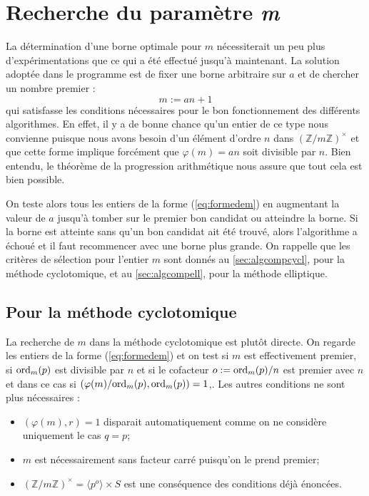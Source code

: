 \documentclass[a4paper]{article} %
\numberwithin{section}{part}
\numberwithin{equation}{section}
\newcommand\zmodninv[1]{(\mathbb{Z}/#1\mathbb{Z})^{\times}}
\newcommand\groupgen[1]{\langle{#1}\rangle}
\newcommand\ord[2]{\textup{ord}_{#1}(#2)}
\begin{document}
\section{Recherche du paramètre \emph{m}}
La détermination d'une borne optimale pour $m$ nécessiterait un peu plus
d'expérimentations que ce qui a été effectué jusqu'à maintenant. La solution 
adoptée dans le programme est de fixer une borne arbitraire sur $a$ et de 
chercher un nombre premier :
\begin{equation}
\label{eq:formedem}
m := an + 1 
\end{equation}
qui satisfasse les conditions nécessaires pour le bon fonctionnement
des différents algorithmes. En effet, il y a de bonne chance qu'un entier de ce
type nous convienne puisque nous avons besoin d'un élément d'ordre $n$ dans
$\zmodninv{m}$ et que cette forme implique forcément que $\varphi(m) = 
an$ soit divisible par $n$. Bien entendu, le théorème de la progression
arithmétique nous assure que tout cela est bien possible.\par
On teste alors tous les entiers de la forme (\ref{eq:formedem}) en augmentant la
valeur de $a$ jusqu'à tomber sur le premier bon candidat ou atteindre la borne.
Si la borne est atteinte sans qu'un bon candidat ait été trouvé, alors 
l'algorithme a échoué et il faut recommencer avec une borne plus grande. On 
rappelle que les critères de sélection pour l'entier $m$ sont donnés au 
\ref{sec:algcompcycl}, pour la méthode cyclotomique, et au \ref{sec:algcompell},
pour la méthode elliptique.

\subsection{Pour la méthode cyclotomique}
\label{sec:recherchemcycl}

La recherche de $m$ dans la méthode cyclotomique est plutôt directe. On regarde
les entiers de la forme (\ref{eq:formedem}) et on test si $m$ est effectivement
premier, si $\ord{m}{p}$ est divisible par $n$ et si le cofacteur
$o := \ord{m}{p}/n$ est premier avec $n$ et dans ce cas si 
$(\varphi(m)/\ord{m}{p}, \ord{m}{p}) = 1$,. Les autres conditions ne sont plus 
nécessaires :
\vspace{0.3cm}
\begin{itemize}
    \item $(\varphi(m), r) = 1$ disparait automatiquement comme on
    ne considère uniquement le cas $q = p$;
    
    \item $m$ est nécessairement sans facteur carré puisqu'on le prend premier;

    \item $\zmodninv{m} = \groupgen{p^o}\times S$ est une conséquence des
    conditions déjà énoncées.
\end{itemize}
\vspace{0.3cm}
\end{document}
